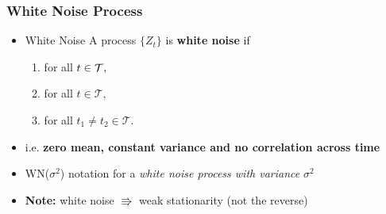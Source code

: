 \documentclass{beamer}
\begin{document}
		\begin{frame}
			\frametitle{White Noise Process}
			\large
			
			\begin{itemize}
				\item[]\large \begin{mydef*}[width=5in]{White Noise} A process $\{Z_t\}$   is \textbf{white noise} if
					\medskip
					\begin{enumerate}\large
						\item[]  for all $t\in\mathcal{T}, \medskip $
						
						
						\item[]  for all $t\in\mathcal{T}, $\medskip
						
						\item[]  for all $t_1\neq t_2 \in \mathcal{T}$.\medskip
					\end{enumerate}
				\end{mydef*}
				
				\item[] i.e. \textbf{zero mean, constant variance and no correlation across time}
				\pause
				
				\vspace{10pt}
				\item[] WN($\sigma^2$) \hspace{10pt} notation for a \textit{white noise process with variance} $\sigma^2$
				\vspace{10pt}
				\pause
				\item[] \textbf{Note:} white noise $\Rrightarrow$  weak stationarity (not  the reverse)
			\end{itemize}
			
		\end{frame}
		
\end{document}
